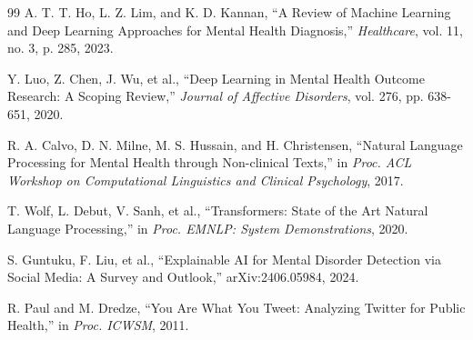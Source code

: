 \documentclass[11pt]{article}
\begin{document}
\begin{thebibliography}{99}
A. T. T. Ho, L. Z. Lim, and K. D. Kannan, ``A Review of Machine Learning and Deep Learning Approaches for Mental Health Diagnosis,'' \textit{Healthcare}, vol. 11, no. 3, p. 285, 2023.

Y. Luo, Z. Chen, J. Wu, et al., ``Deep Learning in Mental Health Outcome Research: A Scoping Review,'' \textit{Journal of Affective Disorders}, vol. 276, pp. 638-651, 2020.

R. A. Calvo, D. N. Milne, M. S. Hussain, and H. Christensen, ``Natural Language Processing for Mental Health through Non-clinical Texts,'' in \textit{Proc. ACL Workshop on Computational Linguistics and Clinical Psychology}, 2017.

T. Wolf, L. Debut, V. Sanh, et al., ``Transformers: State of the Art Natural Language Processing,'' in \textit{Proc. EMNLP: System Demonstrations}, 2020.

S. Guntuku, F. Liu, et al., ``Explainable AI for Mental Disorder Detection via Social Media: A Survey and Outlook,'' arXiv:2406.05984, 2024.

R. Paul and M. Dredze, ``You Are What You Tweet: Analyzing Twitter for Public Health,'' in \textit{Proc. ICWSM}, 2011.

\end{thebibliography}
\end{document}
